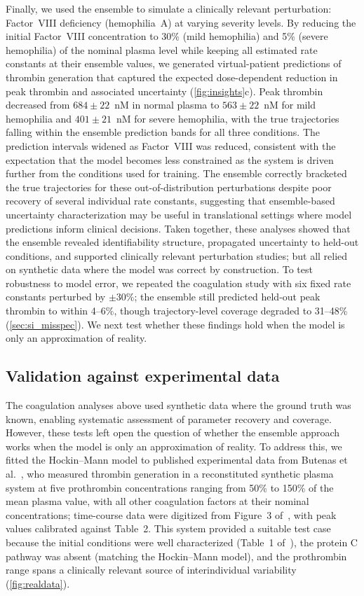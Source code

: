 \documentclass[12pt]{article}
\begin{document}
Finally, we used the ensemble to simulate a clinically relevant perturbation: Factor~VIII deficiency (hemophilia~A) at varying severity levels. By reducing the initial Factor~VIII concentration to 30\% (mild hemophilia) and 5\% (severe hemophilia) of the nominal plasma level while keeping all estimated rate constants at their ensemble values, we generated virtual-patient predictions of thrombin generation that captured the expected dose-dependent reduction in peak thrombin and associated uncertainty (\cref{fig:insights}c). Peak thrombin decreased from $684 \pm 22$~nM in normal plasma to $563 \pm 22$~nM for mild hemophilia and $401 \pm 21$~nM for severe hemophilia, with the true trajectories falling within the ensemble prediction bands for all three conditions. The prediction intervals widened as Factor~VIII was reduced, consistent with the expectation that the model becomes less constrained as the system is driven further from the conditions used for training. The ensemble correctly bracketed the true trajectories for these out-of-distribution perturbations despite poor recovery of several individual rate constants, suggesting that ensemble-based uncertainty characterization may be useful in translational settings where model predictions inform clinical decisions. Taken together, these analyses showed that the ensemble revealed identifiability structure, propagated uncertainty to held-out conditions, and supported clinically relevant perturbation studies; but all relied on synthetic data where the model was correct by construction. To test robustness to model error, we repeated the coagulation study with six fixed rate constants perturbed by $\pm 30\%$; the ensemble still predicted held-out peak thrombin to within 4--6\%, though trajectory-level coverage degraded to 31--48\% (\cref{sec:si_misspec}). We next test whether these findings hold when the model is only an approximation of reality.

\subsection{Validation against experimental data}\label{sec:realdata}
The coagulation analyses above used synthetic data where the ground truth was known, enabling systematic assessment of parameter recovery and coverage. However, these tests left open the question of whether the ensemble approach works when the model is only an approximation of reality. To address this, we fitted the Hockin--Mann model to published experimental data from Butenas et al.~\cite{Butenas1999}, who measured thrombin generation in a reconstituted synthetic plasma system at five prothrombin concentrations ranging from 50\% to 150\% of the mean plasma value, with all other coagulation factors at their nominal concentrations; time-course data were digitized from Figure~3 of~\cite{Butenas1999}, with peak values calibrated against Table~2. This system provided a suitable test case because the initial conditions were well characterized (Table~1 of~\cite{Butenas1999}), the protein C pathway was absent (matching the Hockin--Mann model), and the prothrombin range spans a clinically relevant source of interindividual variability (\cref{fig:realdata}).
\end{document}

